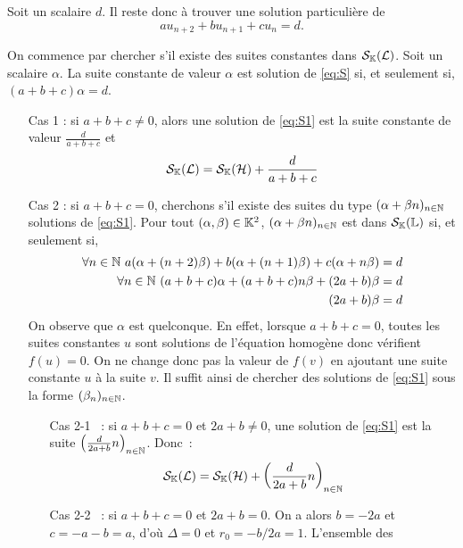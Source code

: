 Soit un scalaire \(d\). Il reste donc à trouver une solution particulière de
\begin{equation}
  au_{n+2}+bu_{n+1}+cu_n = d \label{eq:S1} \tag{\(\Lb\)}.
\end{equation}

On commence par chercher s'il existe des suites constantes dans 
\(\mathcal{S}_{\mathbb{K}}(\mathcal{L})\). Soit un scalaire \(\alpha\). La suite constante de valeur 
\(\alpha\) est solution de \eqref{eq:S} si, et seulement si, 
\((a+b+c)\alpha=d\).
\begin{itemize}
  \item[Cas 1] : si \(a+b+c \neq 0\), alors une solution de \eqref{eq:S1} est 
    la suite constante de valeur \(\frac{d}{a+b+c}\) et
    \begin{equation}
      \mathcal{S}_{\mathbb{K}}(\mathcal{L}) = \mathcal{S}_{\mathbb{K}}(\mathcal{H}) +\frac{d}{a+b+c}
    \end{equation}
  \item[Cas 2] : si \(a+b+c=0\), cherchons s'il existe des suites du type 
    \((\alpha+\beta n)_{n \in \mathbb{N}}\) solutions de \eqref{eq:S1}. Pour tout 
    \((\alpha,\beta) \in \mathbb{K}^2\), \((\alpha + \beta n)_{n \in \mathbb{N}}\) est dans 
    \(\mathcal{S}_{\mathbb{K}}(\mathbb{L})\) si, et seulement si,
    \begin{align}
      \forall n \in \mathbb{N} \ a(\alpha +(n+2)\beta)+b(\alpha+(n+1)\beta)+c(\alpha 
      +n\beta) &=d \\
      \forall n \in \mathbb{N} \ (a+b+c)\alpha +(a+b+c)n\beta +(2a+b)\beta &=d\\
      (2a+b)\beta &=d
    \end{align}
    On observe que \(\alpha\) est quelconque. En effet, lorsque \(a+b+c=0\), 
    toutes les suites constantes \(u\) sont solutions de l'équation homogène 
    donc vérifient \(f(u)=0\). On ne change donc pas la valeur de \(f(v)\) en 
    ajoutant une suite constante \(u\) à la suite \(v\). Il suffit ainsi de 
    chercher des solutions de \eqref{eq:S1} sous la forme \((\beta_n)_{n \in 
    \mathbb{N}}\).
    \begin{itemize}
      \item[Cas 2-1]~: si \(a+b+c=0\) et \(2a+b \neq 0\), une solution de 
        \eqref{eq:S1} est la suite \(\left(\frac{d}{2a+b}n\right)_{n \in 
        \mathbb{N}}\). Donc~:
        \begin{equation}
          \mathcal{S}_{\mathbb{K}}(\mathcal{L}) = \mathcal{S}_{\mathbb{K}}(\mathcal{H}) + \left(\frac{d}{2a+b}n\right)_{n \in \mathbb{N}}
        \end{equation}
      \item[Cas 2-2]~: si \(a+b+c=0\) et \(2a+b = 0\). On a alors \(b=-2a\) et 
        \(c=-a-b=a\), d'où \(\Delta=0\) et \(r_0=-b/2a=1\). L'ensemble des 

\end{itemize}
\end{itemize}
